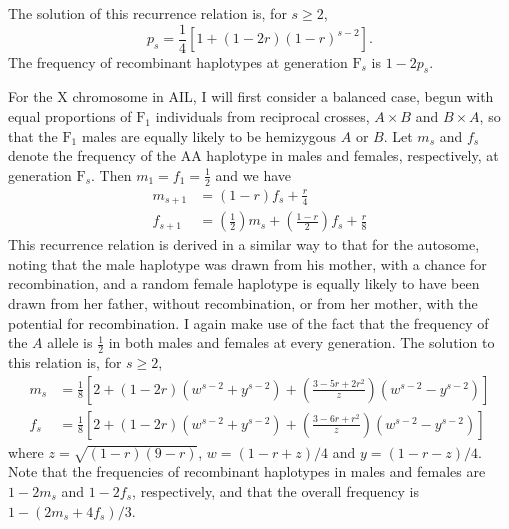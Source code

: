 \documentclass[12pt,letterpaper,pdftex]{article}
\begin{document}
The solution of this recurrence relation \citep[see][]{Graham1994} is, for $s \ge 2$,
\begin{equation}
p_s  = \textstyle{ \frac{1}{4}\left[1 + (1-2r)(1-r)^{s-2}\right] }.
\end{equation}
The frequency of recombinant haplotypes at generation $\text{F}_s$ is
$1-2p_s$.

For the X chromosome in AIL, I will first consider a balanced case, begun
with equal proportions of $\text{F}_1$ individuals from reciprocal
crosses, $A \times B$ and $B \times A$, so that 
the $\text{F}_1$ males are equally likely to be hemizygous $A$ or
$B$.  Let $m_s$ and $f_s$ denote the frequency of the AA haplotype in
males and females, respectively, at generation $\text{F}_s$.  Then $m_1 = f_1 = \frac{1}{2}$ and we have
\begin{equation} \begin{split}
m_{s+1} & = \textstyle{ (1-r)f_s + \frac{r}{4} } \\[6pt]
f_{s+1} & = \textstyle{ \left(\frac{1}{2}\right)m_s + \left(\frac{1-r}{2}\right)
  f_s + \frac{r}{8} } 
\label{eqn:ailXbalrecur}
\end{split} \end{equation}
This recurrence relation is derived in a similar way to that for the
autosome, noting that the male haplotype was drawn from his mother,
with a chance for recombination, and a random female haplotype is
equally likely to have been drawn from her father, without recombination, or
from her mother, with the potential for recombination.  I again make
use of the fact that the frequency of the $A$ allele is $\frac{1}{2}$ in
both males and females at every generation.  The solution to this
relation is, for $s \ge 2$,
\begin{equation} \begin{split}
m_s & = \textstyle{ \frac{1}{8} \left[2 + (1-2r)(w^{s-2} + y^{s-2}) + 
\left(\frac{3 - 5r + 2r^2}{z}\right)(w^{s-2} - y^{s-2})\right] } \\[6pt]
f_s & = \textstyle{ \frac{1}{8} \left[2 + (1-2r)(w^{s-2} + y^{s-2}) + 
\left(\frac{3 - 6r + r^2}{z}\right)(w^{s-2} - y^{s-2})\right] }
\label{eqn:ailXbalsoln}
\end{split} \end{equation}
where $z = \sqrt{(1-r)(9-r)}$, $w = (1-r+z)/4$ and $y =(1-r-z)/4$.
Note that the frequencies of recombinant haplotypes in males and
females are $1-2m_s$ and $1-2f_s$, respectively, and that the overall
frequency is $1 - (2m_s + 4f_s)/3$.
\end{document}
